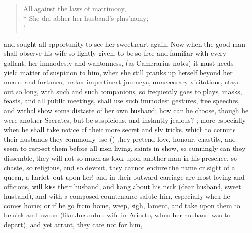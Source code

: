 \translationrule%
\begin{verse}%
All against the laws of matrimony,\\*
She did abhor her husband's phis'nomy;\\!
\end{verse}%
%
and sought all opportunity to see her sweetheart again. Now when the
good man shall observe his wife so lightly given, to be so free and
familiar with every gallant, her immodesty and wantonness, (as
Camerarius notes) it must needs yield matter of suspicion to him,
when she still pranks up herself beyond her means and fortunes, makes
impertinent journeys, unnecessary visitations, stays out so long, with
such and such companions, so frequently goes to plays, masks, feasts,
and all public meetings, shall use such immodest gestures, free
speeches, and withal show some distaste of her own husband; how can he
choose, though he were another Socrates, but be suspicious, and
instantly jealous? ;
more especially when he shall take notice of their more secret and sly
tricks, which to cornute their husbands they commonly use () they pretend love, honour, chastity, and seem to
respect them before all men living, saints in show, so cunningly can
they dissemble, they will not so much as look upon another man in his
presence, so chaste, so religious, and so devout, they cannot
endure the name or sight of a quean, a harlot, out upon her! and in
their outward carriage are most loving and officious, will kiss their
husband, and hang about his neck (dear husband, sweet husband), and
with a composed countenance salute him, especially when he comes home;
or if he go from home, weep, sigh, lament, and take upon them to be
sick and swoon (like Jocundo's wife in Ariosto, when her husband
was to depart), and yet arrant, \etc{} they care not for him,
%
